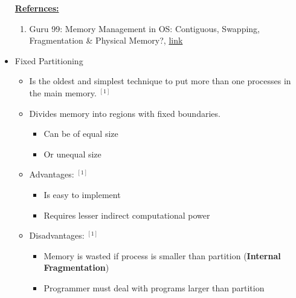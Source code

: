 \documentclass[12pt]{article}
\begin{document}
\begin{itemize}
    \underline{\textbf{Refernces:}}

    \bigskip

    \begin{enumerate}[1)]
        \item Guru 99: Memory Management in OS: Contiguous, Swapping, Fragmentation \& Physical Memory?, \href{https://www.guru99.com/os-memory-management.html#1}{link}
    \end{enumerate}
    \item Fixed Partitioning
    \begin{itemize}
        \item Is the oldest and simplest technique to put more than one processes in
        the main memory. $^{[1]}$
        \item Divides memory into regions with fixed boundaries.
        \begin{itemize}
            \item Can be of equal size
            \item Or unequal size
        \end{itemize}
        \item Advantages: $^{[1]}$
        \begin{itemize}
            \item Is easy to implement
            \item Requires lesser indirect computational power
        \end{itemize}
        \item Disadvantages: $^{[1]}$
        \begin{itemize}
            \item Memory is wasted if process is smaller than partition (\textbf{Internal Fragmentation})
            \item Programmer must deal with programs larger than partition
        \end{itemize}
    \end{itemize}


\end{itemize}
\end{document}
